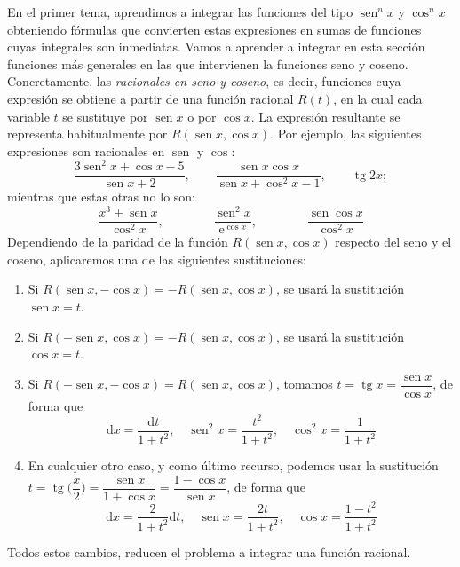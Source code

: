 En el primer tema, aprendimos a integrar las funciones del tipo $\operatorname{sen}^nx$ y $\cos^nx$ obteniendo fórmulas que convierten estas expresiones en sumas de funciones cuyas integrales son inmediatas.
Vamos a aprender a integrar en esta sección funciones más generales en las que intervienen la funciones seno y coseno.
Concretamente, las \emph{racionales en seno y coseno}, es decir, funciones cuya expresión se obtiene a partir de una función racional $R(t)$, en la cual cada variable $t$ se sustituye por $\operatorname{sen} x$ o por $\cos x$.
La expresión resultante se representa habitualmente por 
$R(\operatorname{sen} x,\cos x)$.
Por ejemplo, las siguientes expresiones son racionales en $\operatorname{sen}$ y $\cos$:
\[
\dfrac{3\operatorname{sen}^2 x +\cos x - 5}{\operatorname{sen} x +2},\qquad
\dfrac{\operatorname{sen} x\cos x}{\operatorname{sen} x + \cos^2x -1},\qquad
\operatorname{tg} 2x;
\]
mientras que estas otras no lo son:
\[
\dfrac{x^3+\operatorname{sen} x}{\cos^2 x},
\qquad\qquad
\dfrac{\operatorname{sen}^2 x}{\text{e}^{\cos x}},
\qquad\qquad
\dfrac{\operatorname{sen}\cos x}{\cos^2 x} 
\]
Dependiendo de la paridad de la función $R(\operatorname{sen} x,\cos x)$ respecto del seno y el coseno, aplicaremos una de las siguientes sustituciones:
\begin{enumerate}
\item Si $R(\operatorname{sen} x,-\cos x)=-R(\operatorname{sen} x,\cos x)$, se usará la sustitución $\operatorname{sen} x = t$.
\item Si $R(-\operatorname{sen} x,\cos x)=-R(\operatorname{sen} x,\cos x)$, se usará la sustitución $\cos x = t$.
\item Si $R(-\operatorname{sen} x,-\cos x)=R(\operatorname{sen} x,\cos x)$, tomamos $t=\operatorname{tg} x = \dfrac{\operatorname{sen} x}{\cos x}$, de forma que
$$
\mathrm dx=\dfrac{\mathrm dt}{1+t^2},\quad \operatorname{sen}^2 x = \dfrac{t^2}{1+t^2}, \quad
\cos^2 x=\dfrac{1}{1+t^2}
$$
\item En cualquier otro caso, y como último recurso, podemos usar la sustitución $t=\operatorname{tg} \big(\dfrac{x}2\big)=\dfrac{\operatorname{sen} x}{1+\cos x}=\dfrac{1-\cos x}{\operatorname{sen} x}$, de forma que
$$
\mathrm dx=\dfrac{2}{1+t^2}\mathrm dt,\quad \operatorname{sen} x = \dfrac{2t}{1+t^2}, \quad
\cos x=\dfrac{1-t^2}{1+t^2}
$$
\end{enumerate}
%
Todos estos cambios, reducen el problema a integrar una función racional.
%
